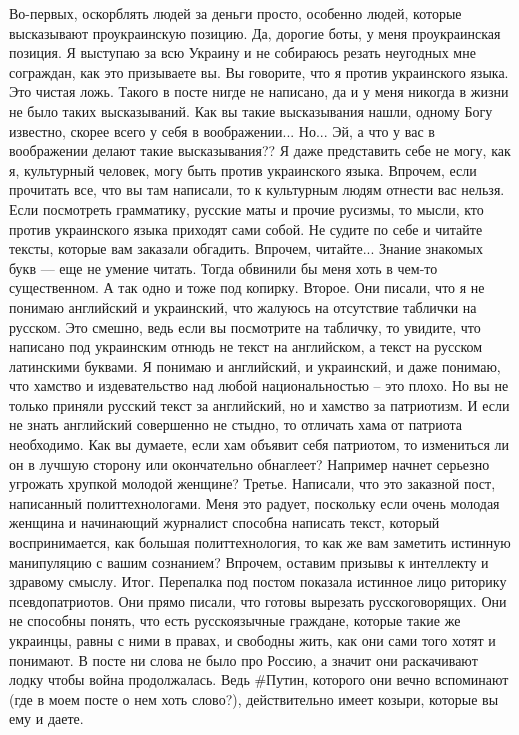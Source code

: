 Во-первых, оскорблять людей за деньги просто, особенно людей, которые высказывают проукраинскую позицию. Да, дорогие боты, у меня проукраинская позиция. Я выступаю за всю Украину и не собираюсь резать неугодных мне сограждан, как это призываете вы.
Вы говорите, что я против украинского языка. Это чистая ложь. Такого в посте нигде не написано, да и у меня никогда в жизни не было таких высказываний. Как вы такие высказывания нашли, одному Богу известно, скорее всего у себя в воображении... Но... Эй, а что у вас в воображении делают такие высказывания?? Я даже представить себе не могу, как я, культурный человек, могу быть против украинского языка. Впрочем, если прочитать все, что вы там написали, то к культурным людям отнести вас нельзя. 
Если посмотреть грамматику, русские маты и прочие русизмы, то мысли, кто против украинского языка приходят сами собой. Не судите по себе и читайте тексты, которые вам заказали обгадить. Впрочем, читайте... Знание знакомых букв — еще не умение читать. Тогда обвинили бы меня хоть в чем-то существенном. А так одно и тоже под копирку. 
Второе. Они писали, что я не понимаю английский и украинский, что жалуюсь на отсутствие таблички на русском. 
Это смешно, ведь если вы посмотрите на табличку, то увидите, что написано под украинским отнюдь не текст на английском, а текст на русском латинскими буквами. Я понимаю и английский, и украинский, и даже понимаю, что хамство и издевательство над любой национальностью – это плохо. 
Но вы не только приняли русский текст за английский, но и хамство за патриотизм. И если не знать английский совершенно не стыдно, то отличать хама от патриота необходимо. Как вы думаете, если хам объявит себя патриотом, то измениться ли он в лучшую сторону или окончательно обнаглеет? Например начнет серьезно угрожать хрупкой молодой женщине?
Третье. Написали, что это заказной пост, написанный политтехнологами. 
Меня это радует, поскольку если очень молодая женщина и начинающий журналист способна написать текст, который воспринимается, как большая политтехнология, то как же вам заметить истинную манипуляцию с вашим сознанием? Впрочем, оставим призывы к интеллекту и здравому смыслу.
Итог.
Перепалка под постом показала истинное лицо риторику псевдопатриотов. Они прямо писали, что готовы вырезать русскоговорящих. Они не способны понять, что есть русскоязычные граждане, которые такие же украинцы, равны с ними в правах, и свободны жить, как они сами того хотят и понимают. 
В посте ни слова не было про Россию, а значит они раскачивают лодку чтобы война продолжалась. Ведь #Путин, которого они вечно вспоминают (где в моем посте о нем хоть слово?), действительно имеет козыри, которые вы ему и даете. 
